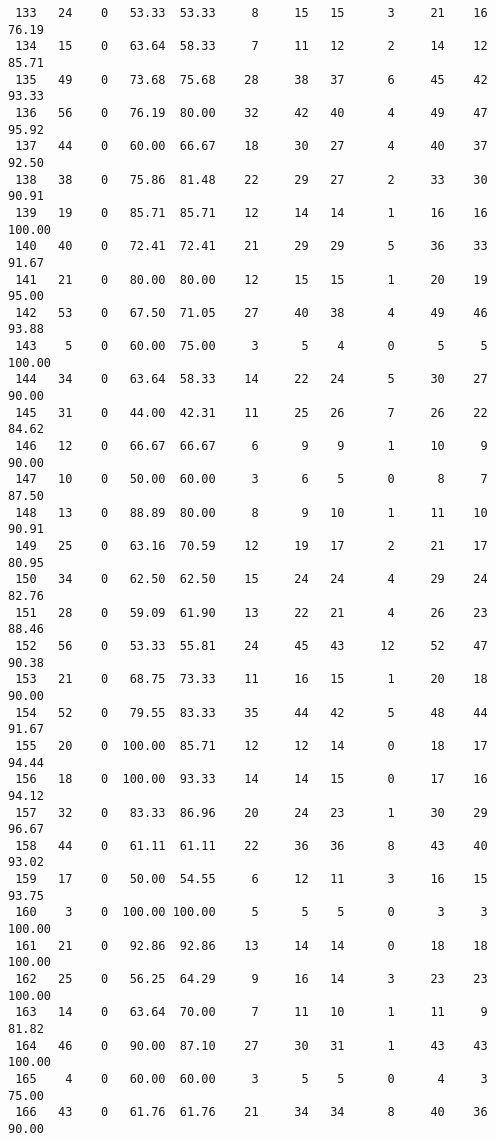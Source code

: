 \begin{verbatim}
 133   24    0   53.33  53.33     8     15   15      3     21    16    76.19
 134   15    0   63.64  58.33     7     11   12      2     14    12    85.71
 135   49    0   73.68  75.68    28     38   37      6     45    42    93.33
 136   56    0   76.19  80.00    32     42   40      4     49    47    95.92
 137   44    0   60.00  66.67    18     30   27      4     40    37    92.50
 138   38    0   75.86  81.48    22     29   27      2     33    30    90.91
 139   19    0   85.71  85.71    12     14   14      1     16    16   100.00
 140   40    0   72.41  72.41    21     29   29      5     36    33    91.67
 141   21    0   80.00  80.00    12     15   15      1     20    19    95.00
 142   53    0   67.50  71.05    27     40   38      4     49    46    93.88
 143    5    0   60.00  75.00     3      5    4      0      5     5   100.00
 144   34    0   63.64  58.33    14     22   24      5     30    27    90.00
 145   31    0   44.00  42.31    11     25   26      7     26    22    84.62
 146   12    0   66.67  66.67     6      9    9      1     10     9    90.00
 147   10    0   50.00  60.00     3      6    5      0      8     7    87.50
 148   13    0   88.89  80.00     8      9   10      1     11    10    90.91
 149   25    0   63.16  70.59    12     19   17      2     21    17    80.95
 150   34    0   62.50  62.50    15     24   24      4     29    24    82.76
 151   28    0   59.09  61.90    13     22   21      4     26    23    88.46
 152   56    0   53.33  55.81    24     45   43     12     52    47    90.38
 153   21    0   68.75  73.33    11     16   15      1     20    18    90.00
 154   52    0   79.55  83.33    35     44   42      5     48    44    91.67
 155   20    0  100.00  85.71    12     12   14      0     18    17    94.44
 156   18    0  100.00  93.33    14     14   15      0     17    16    94.12
 157   32    0   83.33  86.96    20     24   23      1     30    29    96.67
 158   44    0   61.11  61.11    22     36   36      8     43    40    93.02
 159   17    0   50.00  54.55     6     12   11      3     16    15    93.75
 160    3    0  100.00 100.00     5      5    5      0      3     3   100.00
 161   21    0   92.86  92.86    13     14   14      0     18    18   100.00
 162   25    0   56.25  64.29     9     16   14      3     23    23   100.00
 163   14    0   63.64  70.00     7     11   10      1     11     9    81.82
 164   46    0   90.00  87.10    27     30   31      1     43    43   100.00
 165    4    0   60.00  60.00     3      5    5      0      4     3    75.00
 166   43    0   61.76  61.76    21     34   34      8     40    36    90.00

\end{verbatim}
